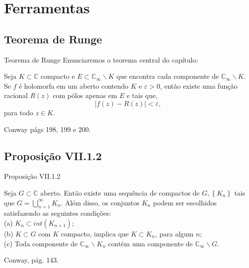 \documentclass{libs/ufc_format}
\begin{document}
\section{Ferramentas}
\subsection{Teorema de Runge}
\begin{frame}{Teorema de Runge}
   Enunciaremos o teorema central do capítulo:
    \begin{teo}[Runge]
    Seja $K\subset \mathbb{C}$ compacto e $E\subset \mathbb{C}_{\infty}\backslash K$ que encontra cada componente de $\mathbb{C}_{\infty}\backslash K$. Se $f$ é holomorfa em um aberto contendo $K$ e $\varepsilon>0$, então existe uma função racional $R(z)$ com pólos apenas em $E$ e tais que, 
    $$|f(z)-R(z)|<\varepsilon,$$
   para todo $z\in K$.
         \end{teo}
\pause 

\begin{prova}
Conway págs 198, 199 e 200.
\end{prova}
    \vspace{0.4cm} %
    
  \end{frame}



\subsection{Proposição VII.1.2}
\begin{frame}{Proposição VII.1.2}
   \begin{prop}[VII.1.2]
   Seja $G\subset \mathbb{C}$ aberto. Então existe uma sequência de compactos de $G, \left \lbrace K_{n} \right \rbrace $ tais que $G=\displaystyle \bigcup_{n=1}^{\infty}K_{n}$. Além disso, os conjuntos $K_{n}$ podem ser escolhidos satisfazendo as seguintes condições:\\
   \pause
   (a) $K_{n}\subset int\left( K_{n+1} \right)$;\\
   \pause
   (b) $K\subset G$ com $K$ compacto, implica que $K\subset K_{n}$, para algum $n$;\\
   \pause
   (c) Toda componente de $\mathbb{C}_{\infty}\backslash K_{n}$ contém uma componente de $\mathbb{C}_{\infty}\backslash G$.
   \end{prop}
   
   \pause
   
   \begin{prova}
   Conway, pág. 143. 
   \end{prova}
\end{frame}
\end{document}

